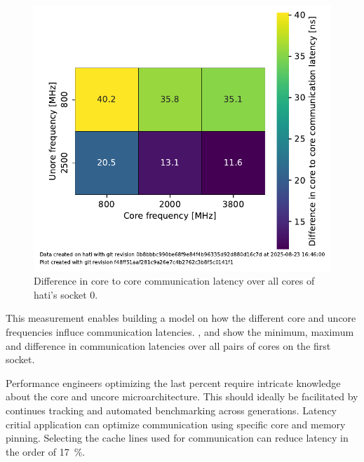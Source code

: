 \begin{figure}[]
    \centering
    \includegraphics[width=0.8\columnwidth]{fig/core-to-core-latency/all-to-all-heatmap-diff.pdf}
    \caption{\label{fig:cbo-latencies-socket-diff}Difference in core to core communication latency over all cores of hati's socket 0.}
\end{figure}

This measurement enables building a model on how the different core and uncore frequencies influce communication latencies.
,  and  show the minimum, maximum and difference in communication latencies over all pairs of cores on the first socket.

Performance engineers optimizing the last percent require intricate knowledge about the core and uncore microarchitecture.
This should ideally be facilitated by continues tracking and automated benchmarking across generations.
Latency critial application can optimize communication using specific core and memory pinning.
Selecting the cache lines used for communication can reduce latency in the order of \SI{17}{\percent}.